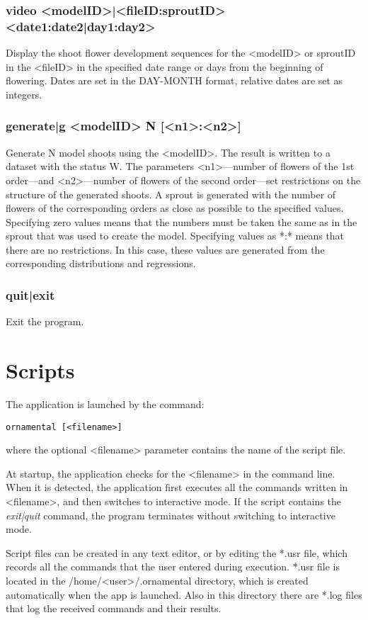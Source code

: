 \documentclass[a4paper]{article}
\begin{document}
\subsubsection{video <modelID>|<fileID:sproutID> <date1:date2|day1:day2>}
Display the shoot flower development sequences for the <modelID> or sproutID in the <fileID> in the specified date range or days from the beginning of flowering. Dates are set in the DAY-MONTH format, relative dates are set as integers.

\subsubsection{generate|g <modelID> N [<n1>:<n2>]}
Generate N model shoots using the <modelID>. The result is written to a dataset with the status W. The parameters <n1>---number of flowers of the 1st order---and <n2>---number of flowers of the second order---set restrictions on the structure of the generated shoots. A sprout is generated with the number of flowers of the corresponding orders as close as possible to the specified values. Specifying zero values means that the numbers must be taken the same as in the sprout that was used to create the model. Specifying values as *:* means that there are no restrictions. In this case, these values are generated from the corresponding distributions and regressions.

\subsubsection{quit|exit}
Exit the program.

\section{Scripts}

The application is launched by the command:
\begin{lstlisting}
ornamental [<filename>] 
\end{lstlisting}
where the optional <filename> parameter contains the name of the script file.

At startup, the application checks for the <filename> in the command line. When it is detected, the application first executes all the commands written in <filename>, and then switches to interactive mode. If the script contains the \textit{exit|quit} command, the program terminates without switching to interactive mode.

Script files can be created in any text editor, or by editing the *.usr file, which records all the commands that the user entered during execution. *.usr file is located in the /home/<user>/.ornamental directory, which is created automatically when the app is launched. Also in this directory there are *.log files that log the received commands and their results.
\end{document}
